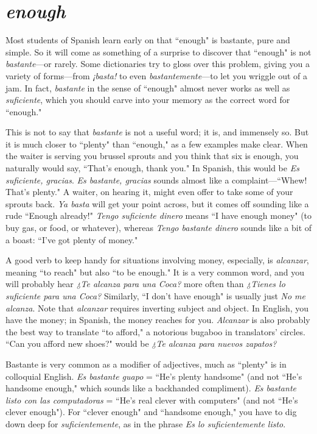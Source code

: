 \section{\emph{enough}}

Most students of Spanish learn early on that ``enough" is bastante, pure and simple. So it will come as something of a surprise to
discover that ``enough" is not \emph{bastante}---or rarely. Some dictionaries
try to gloss over this problem, giving you a variety of forms---from
\emph{¡basta!} to even \emph{bastantemente}---to let you wriggle out of a jam. In
fact, \emph{bastante} in the sense of ``enough" almost never works as well as
\emph{suficiente}, which you should carve into your memory as the correct
word for ``enough."

This is not to say that \emph{bastante} is not a useful word; it is,
and immensely so. But it is much closer to ``plenty" than ``enough,"
as a few examples make clear. When the waiter is serving you brussel sprouts and you think that six is enough, you naturally would say,
``That's enough, thank you." In Spanish, this would be \emph{Es suficiente,
gracias}. \emph{Es bastante, gracias} sounds almost like a complaint---``Whew!
That's plenty." A waiter, on hearing it, might even offer to take some
of your sprouts back. \emph{Ya basta} will get your point across, but it comes
off sounding like a rude ``Enough already!" \emph{Tengo suficiente dinero}
means ``I have enough money" (to buy gas, or food, or whatever),
whereas \emph{Tengo bastante dinero} sounds like a bit of a boast: ``I've got
plenty of money."

A good verb to keep handy for situations involving money, especially, is \emph{alcanzar}, meaning ``to reach" but also ``to be enough." It is
a very common word, and you will probably hear \emph{¿Te alcanza para una
Coca?} more often than \emph{¿Tienes lo suficiente para una Coca?} Similarly,
``I don't have enough" is usually just \emph{No me alcanza}. Note that
\emph{alcanzar} requires inverting subject and object. In English, you have the
money; in Spanish, the money reaches for you. \emph{Alcanzar} is also probably the best way to translate ``to afford," a notorious bugaboo in translators' circles. ``Can you afford new shoes?" would be \emph{¿Te alcanza para
nuevos zapatos?}

Bastante is very common as a modifier of adjectives, much as
``plenty" is in colloquial English. \emph{Es bastante guapo} = ``He's plenty
handsome" (and not ``He's handsome enough," which sounds like a
backhanded compliment). \emph{Es bastante listo con las computadoras} =
``He's real clever with computers" (and not ``He's clever enough"). For
``clever enough" and ``handsome enough," you have to dig down deep
for \emph{suficientemente}, as in the phrase \emph{Es lo suficientemente listo}.

